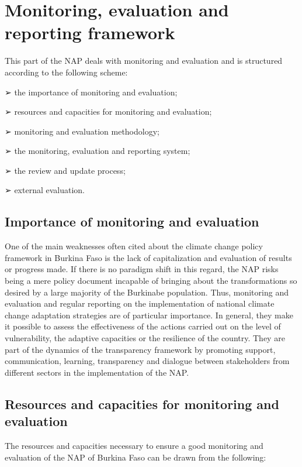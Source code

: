 \documentclass[
]{book}
\begin{document}
\chapter{Monitoring, evaluation and reporting framework}\label{monitoring-evaluation-and-reporting-framework}

This part of the NAP deals with monitoring and evaluation and is structured according to the following scheme:

➢ the importance of monitoring and evaluation;

➢ resources and capacities for monitoring and evaluation;

➢ monitoring and evaluation methodology;

➢ the monitoring, evaluation and reporting system;

➢ the review and update process;

➢ external evaluation.

\section{Importance of monitoring and evaluation}\label{importance-of-monitoring-and-evaluation}

One of the main weaknesses often cited about the climate change policy framework in Burkina Faso is the lack of capitalization and evaluation of results or progress made. If there is no paradigm shift in this regard, the NAP risks being a mere policy document incapable of bringing about the transformations so desired by a large majority of the Burkinabe population. Thus, monitoring and evaluation and regular reporting on the implementation of national climate change adaptation strategies are of particular importance. In general, they make it possible to assess the effectiveness of the actions carried out on the level of vulnerability, the adaptive capacities or the resilience of the country. They are part of the dynamics of the transparency framework by promoting support, communication, learning, transparency and dialogue between stakeholders from different sectors in the implementation of the NAP.

\section{Resources and capacities for monitoring and evaluation}\label{resources-and-capacities-for-monitoring-and-evaluation}

The resources and capacities necessary to ensure a good monitoring and evaluation of the NAP of Burkina Faso can be drawn from the following:
\end{document}
